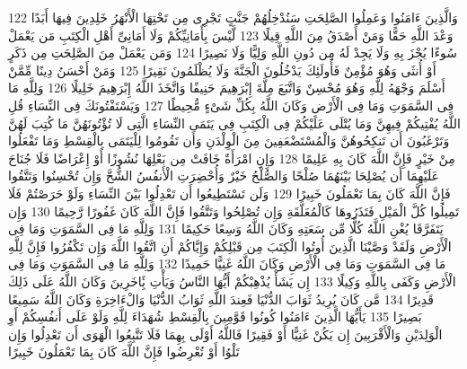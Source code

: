 \documentclass[20pt,a4paper]{article}
\begin{document}
{\tiny\colorbox{cl_aya}{122}} وَالَّذِينَ ءَامَنُوا وَعَمِلُوا الصَّلِحَتِ سَنُدْخِلُهُمْ جَنَّتٍ تَجْرِى مِن تَحْتِهَا الْأَنْهَرُ خَلِدِينَ فِيهَا أَبَدًا وَعْدَ اللَّهِ حَقًّا وَمَنْ أَصْدَقُ مِنَ اللَّهِ قِيلًا
{\tiny\colorbox{cl_aya}{123}} لَّيْسَ بِأَمَانِيِّكُمْ وَلَا أَمَانِىِّ أَهْلِ الْكِتَبِ مَن يَعْمَلْ سُوءًا يُجْزَ بِهِ وَلَا يَجِدْ لَهُ مِن دُونِ اللَّهِ وَلِيًّا وَلَا نَصِيرًا
{\tiny\colorbox{cl_aya}{124}} وَمَن يَعْمَلْ مِنَ الصَّلِحَتِ مِن ذَكَرٍ أَوْ أُنثَى وَهُوَ مُؤْمِنٌ فَأُولَئِكَ يَدْخُلُونَ الْجَنَّةَ وَلَا يُظْلَمُونَ نَقِيرًا
{\tiny\colorbox{cl_aya}{125}} وَمَنْ أَحْسَنُ دِينًا مِّمَّنْ أَسْلَمَ وَجْهَهُ لِلَّهِ وَهُوَ مُحْسِنٌ وَاتَّبَعَ مِلَّةَ إِبْرَهِيمَ حَنِيفًا وَاتَّخَذَ اللَّهُ إِبْرَهِيمَ خَلِيلًا
{\tiny\colorbox{cl_aya}{126}} وَلِلَّهِ مَا فِى السَّمَوَتِ وَمَا فِى الْأَرْضِ وَكَانَ اللَّهُ بِكُلِّ شَىْءٍ مُّحِيطًا
{\tiny\colorbox{cl_aya}{127}} وَيَسْتَفْتُونَكَ فِى النِّسَاءِ قُلِ اللَّهُ يُفْتِيكُمْ فِيهِنَّ وَمَا يُتْلَى عَلَيْكُمْ فِى الْكِتَبِ فِى يَتَمَى النِّسَاءِ الَّتِى لَا تُؤْتُونَهُنَّ مَا كُتِبَ لَهُنَّ وَتَرْغَبُونَ أَن تَنكِحُوهُنَّ وَالْمُسْتَضْعَفِينَ مِنَ الْوِلْدَنِ وَأَن تَقُومُوا لِلْيَتَمَى بِالْقِسْطِ وَمَا تَفْعَلُوا مِنْ خَيْرٍ فَإِنَّ اللَّهَ كَانَ بِهِ عَلِيمًا
{\tiny\colorbox{cl_aya}{128}} وَإِنِ امْرَأَةٌ خَافَتْ مِن بَعْلِهَا نُشُوزًا أَوْ إِعْرَاضًا فَلَا جُنَاحَ عَلَيْهِمَا أَن يُصْلِحَا بَيْنَهُمَا صُلْحًا وَالصُّلْحُ خَيْرٌ وَأُحْضِرَتِ الْأَنفُسُ الشُّحَّ وَإِن تُحْسِنُوا وَتَتَّقُوا فَإِنَّ اللَّهَ كَانَ بِمَا تَعْمَلُونَ خَبِيرًا
{\tiny\colorbox{cl_aya}{129}} وَلَن تَسْتَطِيعُوا أَن تَعْدِلُوا بَيْنَ النِّسَاءِ وَلَوْ حَرَصْتُمْ فَلَا تَمِيلُوا كُلَّ الْمَيْلِ فَتَذَرُوهَا كَالْمُعَلَّقَةِ وَإِن تُصْلِحُوا وَتَتَّقُوا فَإِنَّ اللَّهَ كَانَ غَفُورًا رَّحِيمًا
{\tiny\colorbox{cl_aya}{130}} وَإِن يَتَفَرَّقَا يُغْنِ اللَّهُ كُلًّا مِّن سَعَتِهِ وَكَانَ اللَّهُ وَسِعًا حَكِيمًا
{\tiny\colorbox{cl_aya}{131}} وَلِلَّهِ مَا فِى السَّمَوَتِ وَمَا فِى الْأَرْضِ وَلَقَدْ وَصَّيْنَا الَّذِينَ أُوتُوا الْكِتَبَ مِن قَبْلِكُمْ وَإِيَّاكُمْ أَنِ اتَّقُوا اللَّهَ وَإِن تَكْفُرُوا فَإِنَّ لِلَّهِ مَا فِى السَّمَوَتِ وَمَا فِى الْأَرْضِ وَكَانَ اللَّهُ غَنِيًّا حَمِيدًا
{\tiny\colorbox{cl_aya}{132}} وَلِلَّهِ مَا فِى السَّمَوَتِ وَمَا فِى الْأَرْضِ وَكَفَى بِاللَّهِ وَكِيلًا
{\tiny\colorbox{cl_aya}{133}} إِن يَشَأْ يُذْهِبْكُمْ أَيُّهَا النَّاسُ وَيَأْتِ بَِٔاخَرِينَ وَكَانَ اللَّهُ عَلَى ذَلِكَ قَدِيرًا
{\tiny\colorbox{cl_aya}{134}} مَّن كَانَ يُرِيدُ ثَوَابَ الدُّنْيَا فَعِندَ اللَّهِ ثَوَابُ الدُّنْيَا وَالْءَاخِرَةِ وَكَانَ اللَّهُ سَمِيعًا بَصِيرًا
{\tiny\colorbox{cl_aya}{135}} يَأَيُّهَا الَّذِينَ ءَامَنُوا كُونُوا قَوَّمِينَ بِالْقِسْطِ شُهَدَاءَ لِلَّهِ وَلَوْ عَلَى أَنفُسِكُمْ أَوِ الْوَلِدَيْنِ وَالْأَقْرَبِينَ إِن يَكُنْ غَنِيًّا أَوْ فَقِيرًا فَاللَّهُ أَوْلَى بِهِمَا فَلَا تَتَّبِعُوا الْهَوَى أَن تَعْدِلُوا وَإِن تَلْوُا أَوْ تُعْرِضُوا فَإِنَّ اللَّهَ كَانَ بِمَا تَعْمَلُونَ خَبِيرًا
\end{document}

